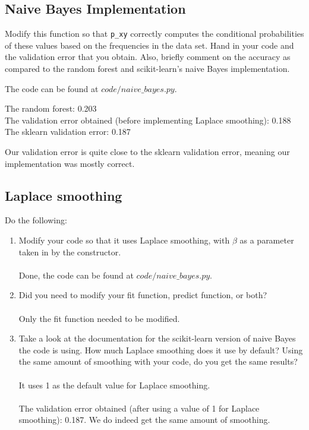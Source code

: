 \documentclass{article}
\def\blu#1{{\color{blu}#1}}
\def\enum#1{\begin{enumerate}#1\end{enumerate}}
\begin{document}
\subsection{Naive Bayes Implementation}

\blu{Modify this function so that \texttt{p\_xy} correctly
computes the conditional probabilities of these values based on the
frequencies in the data set. Hand in your code and the validation error that you obtain.
Also, briefly comment on the accuracy as compared to the random forest and scikit-learn's naive Bayes implementation.}

The code can be found at $code/naive\_bayes.py$.

The random forest: 0.203\\
The validation error obtained (before implementing Laplace smoothing): 0.188\\
The sklearn validation error: 0.187

Our validation error is quite close to the sklearn validation error, meaning our implementation was mostly correct.

\subsection{Laplace smoothing}

\blu{Do the following}:
\enum{
\item Modify your code so that it uses Laplace smoothing, with $\beta$ as a parameter taken in by the constructor. \\\\Done, the code can be found at $code/naive\_bayes.py$.
\item Did you need to modify your fit function, predict function, or both? \\\\Only the fit function needed to be modified.
\item Take a look at the documentation for the scikit-learn version of naive Bayes the code is using. How much Laplace smoothing does it use by default? Using the same amount of smoothing with your code, do you get the same results? \\\\It uses 1 as the default value for Laplace smoothing. \\\\The validation error obtained (after using a value of 1 for Laplace smoothing): 0.187. We do indeed get the same amount of smoothing.
}
	
\end{document}
